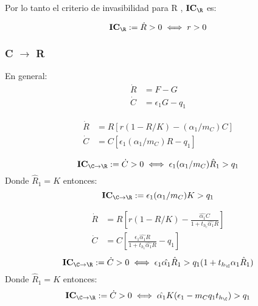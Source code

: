 Por lo tanto el criterio de invasibilidad para R , $\mathbf{IC_\R}$ es:

\begin{equation}\label{eq:ICR}
\mathbf{IC_\R} := \dot{R} > 0 \iff r > 0
\end{equation}


\subsubsection{C $\to$ R}
En general:
\begin{equation}
\begin{aligned}
\dot{R} &= F - G \\
\dot{C} &= \epsilon_1 G - q_1
\end{aligned}
\end{equation}
            
\begin{equation}
\begin{aligned}
\dot{R} &= R\left[r(1-R/K)- (\alpha_{1}/m_C) C \right] \\
\dot{C} &= C \left[\epsilon_1 (\alpha_{1}/m_C) R  -q_1 \right]
\end{aligned}
\end{equation}

\begin{equation} \mathbf{IC_{\C \to \R}} := \dot{C} >0 \iff \epsilon_1(\alpha_1/m_C)\hat{R}_1 > q_1  \end{equation}
Donde $\hat{R}_1 = K$ entonces:
\begin{equation} \mathbf{IC_{\C \to \R}} := \epsilon_1(\alpha_1/m_C) K > q_1 \end{equation}
            
\begin{equation}
\begin{aligned}
\dot{R} &= R\left[r(1-R/K)- \frac{\hat{\alpha_{1}} C}{1+t_{h_{c}} \hat{\alpha_{1}} R} \right] \\
\dot{C} &= C \left[\frac{\epsilon_1 \hat{\alpha_{1}} R}{1+t_{h_{c}}\hat{\alpha_{1}} R} - q_1 \right]
\end{aligned}
\end{equation}
\begin{equation} \mathbf{IC_{\C \to \R}} := \dot{C} > 0 \iff \epsilon_1 \hat{\alpha_{1}} \hat{R}_1 > q_1(1+t_{h_\C}\alpha_{1}\hat{R}_1) \end{equation}
Donde $\hat{R}_1 = K$ entonces:
\begin{equation} \mathbf{IC_{\C \to \R}} := \dot{C} > 0 \iff \hat{\alpha_{1}} K (\epsilon_1 -m_Cq_1 t_{h_\C}) > q_1 \end{equation}

